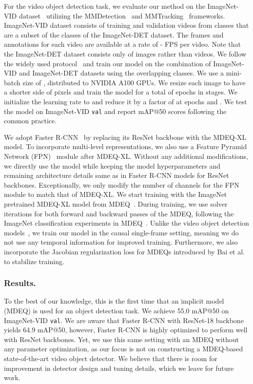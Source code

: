 \documentclass[runningheads]{llncs}
\begin{document}
For the video object detection task, we evaluate our method on the ImageNet-VID dataset~\cite{imagenetviddataset} utilizing the MMDetection~\cite{mmdetection} and MMTracking~\cite{mmtracking} frameworks. ImageNet-VID dataset consists of  training and  validation videos from  classes that are a subset of the  classes of the ImageNet-DET dataset. The frames and annotations for each video are available at a rate of - FPS per video. Note that the ImageNet-DET dataset consists only of images rather than videos. We follow the widely used protocol~\cite{zhu2017fgfa,wang2018manet,deng2019relation,wu2019selsa,chen2020mega} and train our model on the combination of ImageNet-VID and ImageNet-DET datasets using the  overlapping classes. We use a mini-batch size of , distributed to  NVIDIA A100 GPUs. We resize each image to have a shorter side of  pixels and train the model for a total of  epochs in  stages. We initialize the learning rate to  and reduce it by a factor of  at epochs  and . We test the model on ImageNet-VID \texttt{val} and report mAP@50 scores following the common practice.


We adopt Faster R-CNN~\cite{ren2015faster} by replacing its ResNet backbone with the MDEQ-XL model. To incorporate multi-level representations, we also use a Feature Pyramid Network (FPN)~\cite{lin2017feature} module after MDEQ-XL. Without any additional modifications, we directly use the model while keeping the model hyperparameters and remaining architecture details same  as in Faster R-CNN models for ResNet backbones. Exceptionally, we only modify the number of channels for the FPN module to match that of MDEQ-XL. We start training with the ImageNet pretrained MDEQ-XL model from MDEQ~\cite{bai2020mdeq}. During training, we use  solver iterations for both forward and backward passes of the MDEQ, following the ImageNet classification experiments in MDEQ~\cite{bai2020mdeq}. Unlike the video object detection models~\cite{zhu2017fgfa,deng2019relation,chen2020mega}, we train our model in the causal single-frame setting, meaning we do not use any temporal information for improved training. Furthermore, we also incorporate the Jacobian regularization loss for MDEQs introduced by Bai et al.~\cite{bai2021stabilizing} to stabilize training.


\subsubsection{Results.}


To the best of our knowledge, this is the first time that an implicit model (MDEQ) is used for an object detection task. We achieve 55.0 mAP@50 on ImageNet-VID \texttt{val}. We are aware that Faster R-CNN with ResNet-18 backbone yields 64.9 mAP@50, however, Faster R-CNN is highly optimized to perform well with ResNet backbones. Yet, we use this same setting with an MDEQ without any parameter optimization, as our focus is not on constructing a  MDEQ-based state-of-the-art video object detector. We believe that there is room for improvement in detector design and tuning details, which we leave for future work. 
\end{document}
